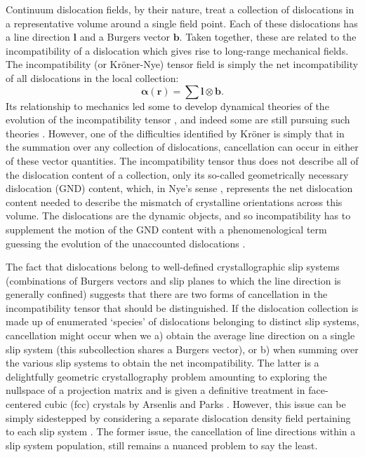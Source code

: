 Continuum dislocation fields, by their nature, treat a collection of dislocations in a representative volume around a single field point. Each of these dislocations has a line direction $\boldsymbol{l}$ and a Burgers vector $\boldsymbol{b}$. Taken together, these are related to the incompatibility of a dislocation which gives rise to long-range mechanical fields. The incompatibility (or Kr\"{o}ner-Nye) tensor field is simply the net incompatibility of all dislocations in the local collection:
$$
\boldsymbol{\alpha}(\boldsymbol{r}) = \sum \boldsymbol{l}\otimes \boldsymbol{b}.$$
Its relationship to mechanics led some to develop dynamical theories of the evolution of the incompatibility tensor \cite{muraContinuousDistributionMoving1963}, and indeed some are still pursuing such theories \cite{Acharya2006,Arora2020}. However, one of the difficulties identified by Kr\"{o}ner \cite{Kroner2001} is simply that in the summation over any collection of dislocations, cancellation can occur in either of these vector quantities. The incompatibility tensor thus does not describe all of the dislocation content of a collection, only its so-called geometrically necessary dislocation (GND) content, which, in Nye's sense \cite{Nye1953}, represents the net dislocation content needed to describe the mismatch of crystalline orientations across this volume. The dislocations are the dynamic objects, and so incompatibility has to supplement the motion of the GND content with a phenomenological term guessing the evolution of the unaccounted dislocations \cite{Acharya2006}. 

The fact that dislocations belong to well-defined crystallographic slip systems (combinations of Burgers vectors and slip planes to which the line direction is generally confined) suggests that there are two forms of cancellation in the incompatibility tensor that should be distinguished. If the dislocation collection is made up of enumerated ‘species’ of dislocations belonging to distinct slip systems, cancellation might occur when we a) obtain the average line direction on a single slip system (this subcollection shares a Burgers vector), or b) when summing over the various slip systems to obtain the net incompatibility. The latter is a delightfully geometric crystallography problem amounting to exploring the nullspace of a projection matrix and is given a definitive treatment in face-centered cubic (fcc) crystals by Arsenlis and Parks \cite{Arsenlis1999}. However, this issue can be simply sidestepped by considering a separate dislocation density field pertaining to each slip system \cite{El-Azab2018}. The former issue, the cancellation of line directions within a slip system population, still remains a nuanced problem to say the least.

